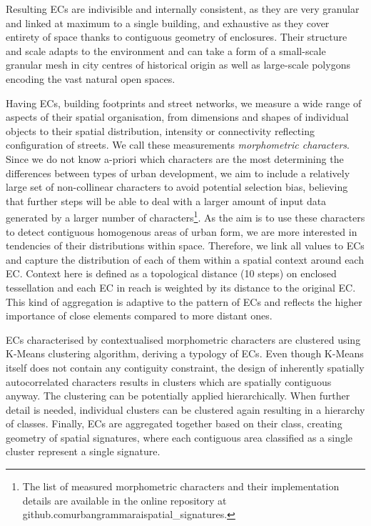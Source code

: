 Resulting ECs are indivisible and internally consistent, as they are very granular and
linked at maximum to a single building, and exhaustive as they cover entirety of space
thanks to contiguous geometry of enclosures. Their structure and scale adapts to the
environment and can take a form of a small-scale granular mesh in city centres of
historical origin as well as large-scale polygons encoding the vast natural open spaces.

Having ECs, building footprints and street networks, we measure a wide range of aspects
of their spatial organisation, from dimensions and shapes of individual objects to their
spatial distribution, intensity or connectivity reflecting configuration of streets. We
call these measurements \textit{morphometric characters}. Since we do not know a-priori
which characters are the most determining the differences between types of urban
development, we aim to include a relatively large set of non-collinear characters to
avoid potential selection bias, believing that further steps will be able to deal with a
larger amount of input data generated by a larger number of characters\footnote{The list
of measured morphometric characters and their implementation details are available in
the online repository at github.com\/urbangrammarai\/spatial_signatures.}. As the aim is
to use these characters to detect contiguous homogenous areas of urban form, we are more
interested in tendencies of their distributions within space. Therefore, we link all
values to ECs and capture the distribution of each of them within a spatial context
around each EC. Context here is defined as a topological distance (10 steps) on enclosed
tessellation and each EC in reach is weighted by its distance to the original EC. This
kind of aggregation is adaptive to the pattern of ECs and reflects the higher importance
of close elements compared to more distant ones.

ECs characterised by contextualised morphometric characters are clustered using K-Means
clustering algorithm, deriving a typology of ECs. Even though K-Means itself does not
contain any contiguity constraint, the design of inherently spatially autocorrelated
characters results in clusters which are spatially contiguous anyway. The clustering can
be potentially applied hierarchically. When further detail is needed, individual
clusters can be clustered again resulting in a hierarchy of classes. Finally, ECs are
aggregated together based on their class, creating geometry of spatial signatures, where
each contiguous area classified as a single cluster represent a single signature.

